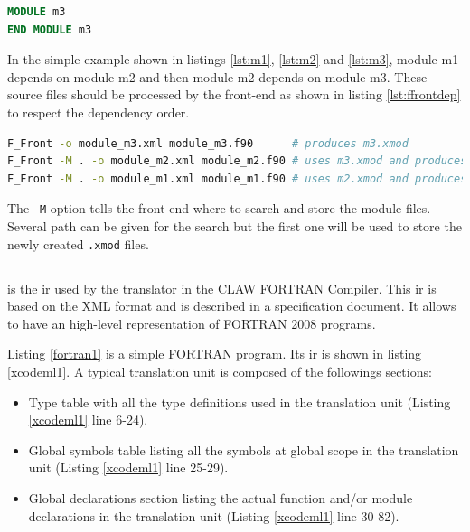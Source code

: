 \begin{lstlisting}[label=lst:m3, language=Fortran, caption=module\_m3.f90]
MODULE m3
END MODULE m3
\end{lstlisting}

In the simple example shown in listings \ref{lst:m1}, \ref{lst:m2} and
\ref{lst:m3}, module m1 depends on module m2 and then module m2
depends on module m3. These source files should be processed by the front-end
as shown in listing \ref{lst:ffrontdep} to respect the dependency order.

\begin{lstlisting}[label=lst:ffrontdep, language=Bash, caption=Parse module with dependencies]
F_Front -o module_m3.xml module_m3.f90      # produces m3.xmod
F_Front -M . -o module_m2.xml module_m2.f90 # uses m3.xmod and produces m2.xmod
F_Front -M . -o module_m1.xml module_m1.f90 # uses m2.xmod and produces m1.xmod
\end{lstlisting}

The \lstinline|-M| option tells the front-end where to search and store the 
module files. Several path can be given for the search but the first one will
be used to store the newly created \lstinline|.xmod| files.


\subsection{\xcodemlf}
\xcodemlf is the \gls{ir} used by the
translator in the CLAW FORTRAN Compiler. This \gls{ir} is based on the XML
format and is described in a specification 
document\cite{omni:xcodemlf95,omni:xcodemlf2008}. It allows to have an
high-level representation of FORTRAN 2008 programs.

Listing \ref{fortran1} is a simple FORTRAN program. Its \xcodemlf \gls{ir} is
shown in listing \ref{xcodeml1}. A typical \xcodemlf translation unit is
composed of the followings sections:
\begin{itemize}
\item Type table with all the type definitions used in the translation unit
(Listing \ref{xcodeml1} line 6-24).
\item Global symbols table listing all the symbols at global scope in the
translation unit (Listing
\ref{xcodeml1} line 25-29).
\item Global declarations section listing the actual function and/or module
declarations in the translation unit (Listing \ref{xcodeml1} line 30-82).
\end{itemize}

